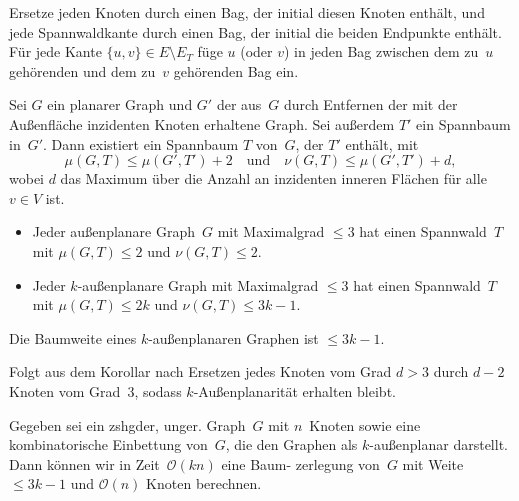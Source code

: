 \documentclass{cheat-sheet}
\renewcommand{\O}{\mathcal{O}} %
\begin{document}
\begin{beweisskizze}
  Ersetze jeden Knoten durch einen Bag, der initial diesen Knoten enthält, und jede Spannwaldkante durch einen Bag, der initial die beiden Endpunkte enthält.
  Für jede Kante $\{ u, v \} \in E \setminus E_T$ füge $u$ (oder $v$) in jeden Bag zwischen dem zu~$u$ gehörenden und dem zu~$v$ gehörenden Bag ein.
\end{beweisskizze}

\begin{lem}
  Sei $G$ ein planarer Graph und $G'$ der aus~$G$ durch Entfernen der mit der Außenfläche inzidenten Knoten erhaltene Graph.
  Sei außerdem $T'$ ein Spannbaum in~$G'$.
  Dann existiert ein Spannbaum $T$ von~$G$, der $T'$ enthält, mit
  \[
    \mu(G, T) \leq \mu(G', T') + 2
    \quad \text{und} \quad
    \nu(G, T) \leq \mu(G', T') + d,
  \]
  wobei $d$ das Maximum über die Anzahl an inzidenten inneren Flächen für alle $v \in V$ ist.
\end{lem}

\begin{kor}
  \begin{itemize}
    \item Jeder außenplanare Graph~$G$ mit Maximalgrad $\leq 3$ hat einen Spannwald~$T$ mit $\mu(G, T) \leq 2$ und $\nu(G, T) \leq 2$.
    \item Jeder $k$-außenplanare Graph mit Maximalgrad $\leq 3$ hat einen Spannwald~$T$ mit $\mu(G, T) \leq 2 k$ und $\nu(G, T) \leq 3 k - 1$.
  \end{itemize}
\end{kor}

\begin{satz}
  Die Baumweite eines $k$-außenplanaren Graphen ist $\leq 3k - 1$.
\end{satz}

\begin{beweisidee}
  Folgt aus dem Korollar nach Ersetzen jedes Knoten vom Grad $d > 3$ durch $d - 2$ Knoten vom Grad~$3$, sodass $k$-Außenplanarität erhalten bleibt.
\end{beweisidee}

\begin{satz}
  Gegeben sei ein zshgder, unger. Graph~$G$ mit $n$~Knoten sowie eine kombinatorische Einbettung von~$G$, die den Graphen als $k$-außenplanar darstellt.
  Dann können wir in Zeit~$\O(k n)$ eine Baum- zerlegung von~$G$ mit Weite $\leq 3 k - 1$ und $\O(n)$ Knoten berechnen.
\end{satz}
\end{document}
